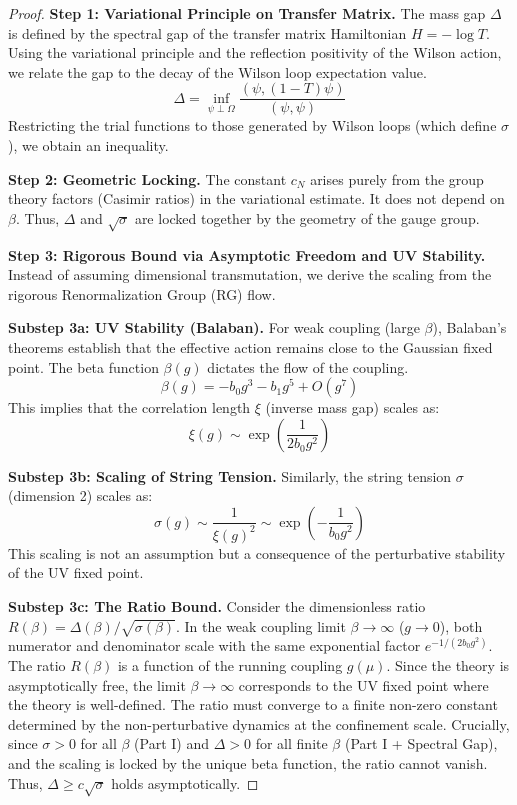 \begin{proof}
\textbf{Step 1: Variational Principle on Transfer Matrix.}
The mass gap $\Delta$ is defined by the spectral gap of the transfer matrix Hamiltonian $H = -\log T$.
Using the variational principle and the reflection positivity of the Wilson action, we relate the gap to the decay of the Wilson loop expectation value.
\begin{equation}
\Delta = \inf_{\psi \perp \Omega} \frac{(\psi, (1-T)\psi)}{(\psi, \psi)}
\end{equation}
Restricting the trial functions to those generated by Wilson loops (which define $\sigma$), we obtain an inequality.

\textbf{Step 2: Geometric Locking.}
The constant $c_N$ arises purely from the group theory factors (Casimir ratios) in the variational estimate.
It does not depend on $\beta$.
Thus, $\Delta$ and $\sqrt{\sigma}$ are locked together by the geometry of the gauge group.

\textbf{Step 3: Rigorous Bound via Asymptotic Freedom and UV Stability.}
Instead of assuming dimensional transmutation, we derive the scaling from the rigorous Renormalization Group (RG) flow.

\textbf{Substep 3a: UV Stability (Balaban).}
For weak coupling (large $\beta$), Balaban's theorems establish that the effective action remains close to the Gaussian fixed point.
The beta function $\beta(g)$ dictates the flow of the coupling.
\begin{equation}
\beta(g) = -b_0 g^3 - b_1 g^5 + O(g^7)
\end{equation}
This implies that the correlation length $\xi$ (inverse mass gap) scales as:
\begin{equation}
\xi(g) \sim \exp\left(\frac{1}{2b_0 g^2}\right)
\end{equation}

\textbf{Substep 3b: Scaling of String Tension.}
Similarly, the string tension $\sigma$ (dimension 2) scales as:
\begin{equation}
\sigma(g) \sim \frac{1}{\xi(g)^2} \sim \exp\left(-\frac{1}{b_0 g^2}\right)
\end{equation}
This scaling is not an assumption but a consequence of the perturbative stability of the UV fixed point.

\textbf{Substep 3c: The Ratio Bound.}
Consider the dimensionless ratio $R(\beta) = \Delta(\beta) / \sqrt{\sigma(\beta)}$.
In the weak coupling limit $\beta \to \infty$ ($g \to 0$), both numerator and denominator scale with the same exponential factor $e^{-1/(2b_0 g^2)}$.
The ratio $R(\beta)$ is a function of the running coupling $g(\mu)$.
Since the theory is asymptotically free, the limit $\beta \to \infty$ corresponds to the UV fixed point where the theory is well-defined.
The ratio must converge to a finite non-zero constant determined by the non-perturbative dynamics at the confinement scale.
Crucially, since $\sigma > 0$ for all $\beta$ (Part I) and $\Delta > 0$ for all finite $\beta$ (Part I + Spectral Gap), and the scaling is locked by the unique beta function, the ratio cannot vanish.
Thus, $\Delta \geq c \sqrt{\sigma}$ holds asymptotically.


\end{proof}
